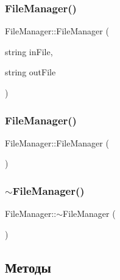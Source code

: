 \hypertarget{class_file_manager_a2456e56bdcb617c3ee75521cf9dd7057}{}\label{class_file_manager_a2456e56bdcb617c3ee75521cf9dd7057} 
\subsubsection{\texorpdfstring{File\+Manager()}{FileManager()}\hspace{0.1cm}{\footnotesize\ttfamily [2/3]}}
{\footnotesize\ttfamily File\+Manager\+::\+File\+Manager (\begin{DoxyParamCaption}\item[{string}]{in\+File,  }\item[{string}]{out\+File }\end{DoxyParamCaption})}

\hypertarget{class_file_manager_a8afd512c06be9daf140cc19d71f9b391}{}\label{class_file_manager_a8afd512c06be9daf140cc19d71f9b391} 
\subsubsection{\texorpdfstring{File\+Manager()}{FileManager()}\hspace{0.1cm}{\footnotesize\ttfamily [3/3]}}
{\footnotesize\ttfamily File\+Manager\+::\+File\+Manager (\begin{DoxyParamCaption}{ }\end{DoxyParamCaption})}

\hypertarget{class_file_manager_abaed33b5b0c13b8a597db9335a1aacfa}{}\label{class_file_manager_abaed33b5b0c13b8a597db9335a1aacfa} 
\subsubsection{\texorpdfstring{$\sim$\+File\+Manager()}{~FileManager()}}
{\footnotesize\ttfamily File\+Manager\+::$\sim$\+File\+Manager (\begin{DoxyParamCaption}{ }\end{DoxyParamCaption})}



\subsection{Методы}
\hypertarget{class_file_manager_ab490a5a5882d33781dcb6d1d42945d97}{}\label{class_file_manager_ab490a5a5882d33781dcb6d1d42945d97} 
